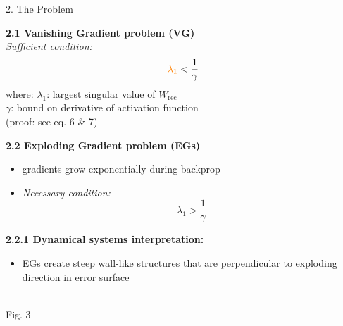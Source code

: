 \documentclass[final]{beamer}
\begin{document}
\begin{frame}[t]
\begin{columns}[t,totalwidth=\textwidth]
        \begin{column}{0.33\textwidth}
            \begin{block}{2. The Problem}
        
            \textbf{2.1 Vanishing Gradient problem (VG)}\\[0.3em]
            \textit{Sufficient condition:}
            \[
                \textcolor{orange}{\lambda_1} < \frac{1}{\gamma}
            \]
            where: $\lambda_1$: largest singular value of $W_{\text{rec}}$\\
            \phantom{where: }$\gamma$: bound on derivative of activation function\\[0.3em]
            (proof: see eq. 6 \& 7)
        
            \vspace{1em}
            \textbf{2.2 Exploding Gradient problem (EGs)}\\[-0.2em]
            \begin{itemize}
                \item gradients grow exponentially during backprop
                \item \textit{Necessary condition:}
                \[
                \lambda_1 > \frac{1}{\gamma}
                \]
            \end{itemize}
        
            \vspace{1em}
            \textbf{2.2.1 Dynamical systems interpretation:}
            \begin{itemize}
                \item EGs create steep wall-like structures 
                    that are perpendicular to exploding direction 
                    in error surface
            \end{itemize}
        
            \vspace{2em}
            \begin{center}
                \\[0.3em]
                Fig. 3
            \end{center}
        
            \end{block}
        \end{column}
  


\end{columns}
\end{frame}
\end{document}
